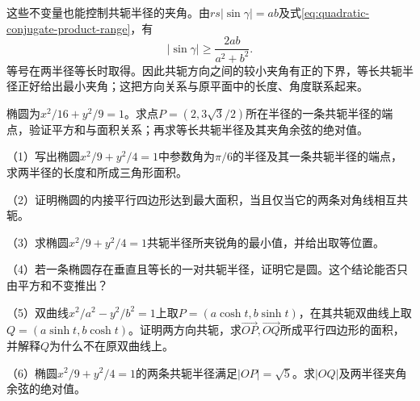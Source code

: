 这些不变量也能控制共轭半径的夹角。由\(rs|\sin\gamma|=ab\)及式\eqref{eq:quadratic-conjugate-product-range}，有
\begin{equation}\label{eq:quadratic-conjugate-angle-bound}
    |\sin\gamma|\ge\frac{2ab}{a^2+b^2} .
\end{equation}
等号在两半径等长时取得。因此共轭方向之间的较小夹角有正的下界，等长共轭半径正好给出最小夹角；这把方向关系与原平面中的长度、角度联系起来。

\par\noindent\begin{minipage}{\linewidth}
\begin{example}
椭圆为\(x^2/16+y^2/9=1\)。求点\(P=(2,3\sqrt3/2)\)所在半径的一条共轭半径的端点，验证平方和与面积关系；再求等长共轭半径及其夹角余弦的绝对值。
\end{example}
\end{minipage}\par


\begin{exercise}
\mbox{}\par\nobreak

\begin{samepage}
（1）写出椭圆\(x^2/9+y^2/4=1\)中参数角为\(\pi/6\)的半径及其一条共轭半径的端点，求两半径的长度和所成三角形面积。
\par
\end{samepage}

\begin{samepage}
（2）证明椭圆的内接平行四边形达到最大面积，当且仅当它的两条对角线相互共轭。
\par
\end{samepage}

\begin{samepage}
（3）求椭圆\(x^2/9+y^2/4=1\)共轭半径所夹锐角的最小值，并给出取等位置。
\par
\end{samepage}

\begin{samepage}
（4）若一条椭圆存在垂直且等长的一对共轭半径，证明它是圆。这个结论能否只由平方和不变推出？
\par
\end{samepage}

\begin{samepage}
（5）双曲线\(x^2/a^2-y^2/b^2=1\)上取\(P=(a\cosh t,b\sinh t)\)，在其共轭双曲线上取\(Q=(a\sinh t,b\cosh t)\)。证明两方向共轭，求\(\overrightarrow{OP},\overrightarrow{OQ}\)所成平行四边形的面积，并解释\(Q\)为什么不在原双曲线上。
\par
\end{samepage}

\begin{samepage}
（6）椭圆\(x^2/9+y^2/4=1\)的两条共轭半径满足\(|OP|=\sqrt5\)。求\(|OQ|\)及两半径夹角余弦的绝对值。
\par
\end{samepage}

\end{exercise}

